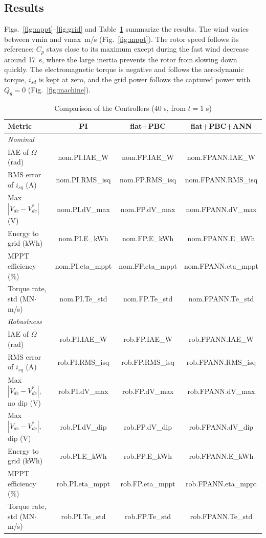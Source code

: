 \documentclass[conference]{IEEEtran}
\begin{document}
\subsection{Results}
Figs.~\ref{fig:mppt}--\ref{fig:grid} and Table~\ref{tab:res} summarize the results. The wind varies
between {{vmin}} and {{vmax}}~m/s (Fig.~\ref{fig:mppt}). The rotor speed follows its reference; $C_p$
stays close to its maximum except during the fast wind decrease around 17~s, where the large inertia
prevents the rotor from slowing down quickly. The electromagnetic torque is negative and follows the
aerodynamic torque, $i_{sd}$ is kept at zero, and the grid power follows the captured power with
$Q_g=0$ (Fig.~\ref{fig:machine}).

\begin{table}[t]
\caption{Comparison of the Controllers (40 s, from $t=1$ s)}
\label{tab:res}
\centering
\footnotesize
\setlength{\tabcolsep}{3pt}
\begin{tabular}{lccc}
\toprule
Metric & PI & flat+PBC & flat+PBC+ANN\\
\midrule
\multicolumn{4}{l}{\emph{Nominal}}\\
IAE of $\Omega$ (rad) & {{nom.PI.IAE_W}} & {{nom.FP.IAE_W}} & {{nom.FPANN.IAE_W}}\\
RMS error of $i_{sq}$ (A) & {{nom.PI.RMS_isq}} & {{nom.FP.RMS_isq}} & {{nom.FPANN.RMS_isq}}\\
Max $|V_{dc}-V_{dc}^*|$ (V) & {{nom.PI.dV_max}} & {{nom.FP.dV_max}} & {{nom.FPANN.dV_max}}\\
Energy to grid (kWh) & {{nom.PI.E_kWh}} & {{nom.FP.E_kWh}} & {{nom.FPANN.E_kWh}}\\
MPPT efficiency (\%) & {{nom.PI.eta_mppt}} & {{nom.FP.eta_mppt}} & {{nom.FPANN.eta_mppt}}\\
Torque rate, std (MN$\cdot$m/s) & {{nom.PI.Te_std}} & {{nom.FP.Te_std}} & {{nom.FPANN.Te_std}}\\
\midrule
\multicolumn{4}{l}{\emph{Robustness}}\\
IAE of $\Omega$ (rad) & {{rob.PI.IAE_W}} & {{rob.FP.IAE_W}} & {{rob.FPANN.IAE_W}}\\
RMS error of $i_{sq}$ (A) & {{rob.PI.RMS_isq}} & {{rob.FP.RMS_isq}} & {{rob.FPANN.RMS_isq}}\\
Max $|V_{dc}-V_{dc}^*|$, no dip (V) & {{rob.PI.dV_max}} & {{rob.FP.dV_max}} & {{rob.FPANN.dV_max}}\\
Max $|V_{dc}-V_{dc}^*|$, dip (V) & {{rob.PI.dV_dip}} & {{rob.FP.dV_dip}} & {{rob.FPANN.dV_dip}}\\
Energy to grid (kWh) & {{rob.PI.E_kWh}} & {{rob.FP.E_kWh}} & {{rob.FPANN.E_kWh}}\\
MPPT efficiency (\%) & {{rob.PI.eta_mppt}} & {{rob.FP.eta_mppt}} & {{rob.FPANN.eta_mppt}}\\
Torque rate, std (MN$\cdot$m/s) & {{rob.PI.Te_std}} & {{rob.FP.Te_std}} & {{rob.FPANN.Te_std}}\\
\bottomrule
\end{tabular}
\end{table}
\end{document}
